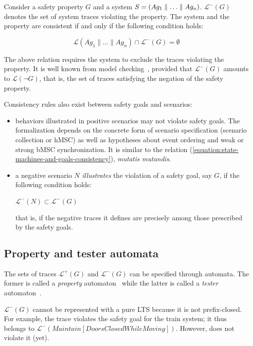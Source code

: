 Consider a safety property $G$ and a system $S = (Ag_1 \parallel \ldots \parallel Ag_n)$. $\mathcal{L}^{-}(G)$ denotes the set of system traces violating the property. The system and the property are consistent if and only if the following condition holds:

\begin{equation}
\mathcal{L}(Ag_1 \parallel \ldots \parallel Ag_n) \cap \mathcal{L}^{-}(G) = \emptyset
\label{equation:state-machines-and-goals-consistency}
\end{equation}

The above relation requires the system to exclude the traces violating the property. It is well known from model checking~\cite{Clarke:1989}, provided that $\mathcal{L}^{-}(G)$ amounts to $\mathcal{L}(\neg G)$, that is, the set of traces satisfying the negation of the safety property. 

Consistency rules also exist between safety goals and scenarios:

\begin{itemize}
\item behaviors illustrated in positive scenarios may not violate safety goals. The formalization depends on the concrete form of scenario specification (scenario collection or hMSC) as well as hypotheses about event ordering and weak or strong bMSC synchronization. It is similar to the relation (\ref{equation:state-machines-and-goals-consistency}), \emph{mutatis mutandis}.
\item a negative scenario $N$ \emph{illustrates} the violation of a safety goal, say $G$, if the following condition holds:
\begin{center}
$\mathcal{L}^{-}(N) \subset \mathcal{L}^{-}(G)$
\end{center}
\noindent that is, if the negative traces it defines are precisely among those prescribed by the safety goals.
\end{itemize}

\subsection{Property and tester automata\label{subsection:background-property-and-tester-automata}}

The sets of traces $\mathcal{L}^{+}(G)$ and $\mathcal{L}^{-}(G)$ can be specified through automata. The former is called a \emph{property} automaton~\cite{Letier:2005, Letier:2008} while the latter is called a \emph{tester} automaton~\cite{Giannakopoulou:2003}.

$\mathcal{L}^{-}(G)$ cannot be represented with a pure LTS because it is not prefix-closed. For example, the trace  violates the safety goal for the train system; it thus belongs to $\mathcal{L}^{-}(Maintain[DoorsClosed While Moving])$. However,  does not violate it (yet). 

